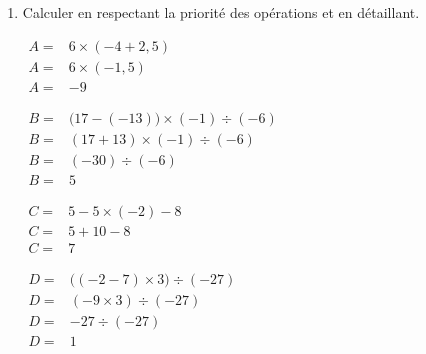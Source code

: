 \documentclass[a4paper]{book}
\begin{document}
{\begin{exercice}
\begin{enumerate}
            \item Calculer en respectant la priorité des opérations et en détaillant.

            \begin{minipage}{0.5\linewidth}
                $\begin{array}{ll}
                    A = & 6\times(-4+2,5) \\
                    A = & 6\times(-1,5) \\
                    A = & -9
                \end{array}$
            \end{minipage}
            \hfill
            \begin{minipage}{0.49\linewidth}
                $\begin{array}{ll}
                    B = & \big(17-(-13)\big)\times(-1)\div(-6)  \\
                    B = & (17+13)\times(-1)\div(-6) \\
                    B = & (-30)\div(-6)\\
                    B = & 5
                \end{array}$
            \end{minipage}
    
            \begin{minipage}{0.5\linewidth}
                $\begin{array}{ll}
                    C = & 5-5\times(-2)-8 \\
                    C = & 5+10-8 \\
                    C = & 7
                \end{array}$
            \end{minipage}
            \hfill
            \begin{minipage}{0.49\linewidth}
                $\begin{array}{ll}
                    D = & \big((-2-7)\times3\big)\div(-27) \\
                    D = & (-9\times3)\div(-27) \\
                    D = & -27\div(-27) \\
                    D = & 1
                \end{array}$
            \end{minipage}
            
        \end{enumerate}
    \end{exercice}


}
\end{document}
